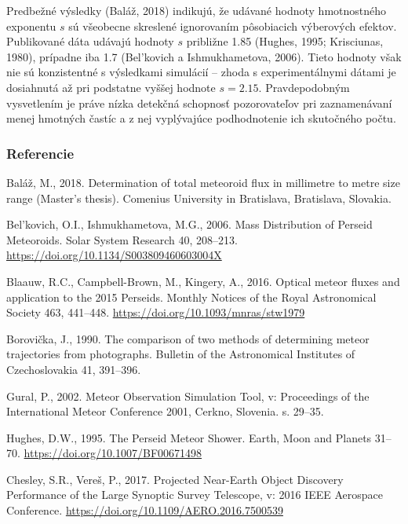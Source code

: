 Predbežné výsledky (Baláž, 2018) indikujú, že udávané hodnoty
hmotnostného exponentu \(s\) sú všeobecne skreslené ignorovaním
pôsobiacich výberových efektov. Publikované dáta udávajú hodnoty \(s\)
približne \num{1.85} (Hughes, 1995; Krisciunas, 1980), prípadne iba
\num{1.7} (Bel'kovich a Ishmukhametova, 2006). Tieto hodnoty však nie sú
konzistentné s výsledkami simulácií -- zhoda s experimentálnymi dátami
je dosiahnutá až pri podstatne vyššej hodnote \(s = \num{2.15}\).
Pravdepodobným vysvetlením je práve nízka detekčná schopnosť
pozorovateľov pri zaznamenávaní menej hmotných častíc a z nej
vyplývajúce podhodnotenie ich skutočného počtu.

\hypertarget{referencie}{%
\subsubsection*{Referencie}\label{referencie}}

\hypertarget{refs}{}
\leavevmode\hypertarget{ref-balaz2018}{}%
Baláž, M., 2018. Determination of total meteoroid flux in millimetre to
metre size range (Master's thesis). Comenius University in Bratislava,
Bratislava, Slovakia.

\leavevmode\hypertarget{ref-belkovich2006}{}%
Bel'kovich, O.I., Ishmukhametova, M.G., 2006. Mass Distribution of
Perseid Meteoroids. Solar System Research 40, 208--213.
\url{https://doi.org/10.1134/S003809460603004X}

\leavevmode\hypertarget{ref-blaauw2016}{}%
Blaauw, R.C., Campbell-Brown, M., Kingery, A., 2016. Optical meteor
fluxes and application to the 2015 Perseids. Monthly Notices of the
Royal Astronomical Society 463, 441--448.
\url{https://doi.org/10.1093/mnras/stw1979}

\leavevmode\hypertarget{ref-borovicka1990}{}%
Borovička, J., 1990. The comparison of two methods of determining meteor
trajectories from photographs. Bulletin of the Astronomical Institutes
of Czechoslovakia 41, 391--396.

\leavevmode\hypertarget{ref-gural2002}{}%
Gural, P., 2002. Meteor Observation Simulation Tool, v: Proceedings of
the International Meteor Conference 2001, Cerkno, Slovenia. s. 29--35.

\leavevmode\hypertarget{ref-hughes1995}{}%
Hughes, D.W., 1995. The Perseid Meteor Shower. Earth, Moon and Planets
31--70. \url{https://doi.org/10.1007/BF00671498}

\leavevmode\hypertarget{ref-chesley2017}{}%
Chesley, S.R., Vereš, P., 2017. Projected Near-Earth Object Discovery
Performance of the Large Synoptic Survey Telescope, v: 2016 IEEE
Aerospace Conference. \url{https://doi.org/10.1109/AERO.2016.7500539}

